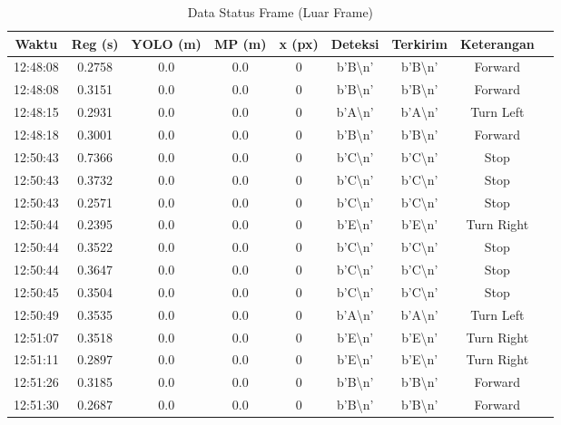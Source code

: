 \begin{table}[H]
    \centering
    \caption{Data Status Frame (Luar Frame)}
    \label{tab:status_luar_frame}
    \begin{tabular}{|c|c|c|c|c|c|c|c|c|}
    \hline
    Waktu & Reg (s) & YOLO (m) & MP (m) & x (px) & Deteksi & Terkirim & Keterangan \\ \hline
    12:48:08 & 0.2758 & 0.0 & 0.0 & 0 & b'B\textbackslash n' & b'B\textbackslash n' & Forward \\ \hline
    12:48:08 & 0.3151 & 0.0 & 0.0 & 0 & b'B\textbackslash n' & b'B\textbackslash n' & Forward \\ \hline
    12:48:15 & 0.2931 & 0.0 & 0.0 & 0 & b'A\textbackslash n' & b'A\textbackslash n' & Turn Left \\ \hline
    12:48:18 & 0.3001 & 0.0 & 0.0 & 0 & b'B\textbackslash n' & b'B\textbackslash n' & Forward \\ \hline
    12:50:43 & 0.7366 & 0.0 & 0.0 & 0 & b'C\textbackslash n' & b'C\textbackslash n' & Stop \\ \hline
    12:50:43 & 0.3732 & 0.0 & 0.0 & 0 & b'C\textbackslash n' & b'C\textbackslash n' & Stop \\ \hline
    12:50:43 & 0.2571 & 0.0 & 0.0 & 0 & b'C\textbackslash n' & b'C\textbackslash n' & Stop \\ \hline
    12:50:44 & 0.2395 & 0.0 & 0.0 & 0 & b'E\textbackslash n' & b'E\textbackslash n' & Turn Right \\ \hline
    12:50:44 & 0.3522 & 0.0 & 0.0 & 0 & b'C\textbackslash n' & b'C\textbackslash n' & Stop \\ \hline
    12:50:44 & 0.3647 & 0.0 & 0.0 & 0 & b'C\textbackslash n' & b'C\textbackslash n' & Stop \\ \hline
    12:50:45 & 0.3504 & 0.0 & 0.0 & 0 & b'C\textbackslash n' & b'C\textbackslash n' & Stop \\ \hline
    12:50:49 & 0.3535 & 0.0 & 0.0 & 0 & b'A\textbackslash n' & b'A\textbackslash n' & Turn Left \\ \hline
    12:51:07 & 0.3518 & 0.0 & 0.0 & 0 & b'E\textbackslash n' & b'E\textbackslash n' & Turn Right \\ \hline
    12:51:11 & 0.2897 & 0.0 & 0.0 & 0 & b'E\textbackslash n' & b'E\textbackslash n' & Turn Right \\ \hline
    12:51:26 & 0.3185 & 0.0 & 0.0 & 0 & b'B\textbackslash n' & b'B\textbackslash n' & Forward \\ \hline
    12:51:30 & 0.2687 & 0.0 & 0.0 & 0 & b'B\textbackslash n' & b'B\textbackslash n' & Forward \\ \hline

\end{tabular}
\end{table}
